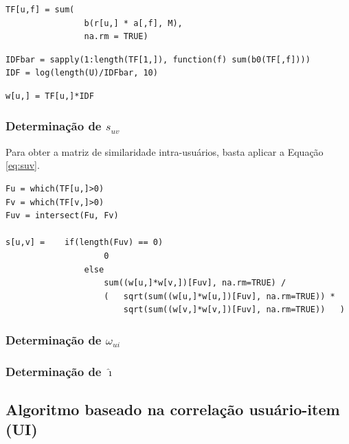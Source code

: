 \begin{lstlisting}[caption=Determinação de $\mathrm{TF}_{uf}$,label=lst:tf]
TF[u,f] = sum(
        		b(r[u,] * a[,f], M),
        		na.rm = TRUE)
\end{lstlisting}


\begin{lstlisting}[caption=Determinação de $\mathrm{IDF}_{f}$,label=lst:idf]
IDFbar = sapply(1:length(TF[1,]), function(f) sum(b0(TF[,f])))
IDF = log(length(U)/IDFbar, 10)
\end{lstlisting}

\begin{lstlisting}[caption=Determinação de $w_{uf}$,label=lst:wuf]
w[u,] = TF[u,]*IDF
\end{lstlisting}

\subsubsection{Determinação de $s_{uv}$} %
\label{ssub:determina_o_de_}

Para obter a matriz de similaridade intra-usuários, basta aplicar a Equação \ref{eq:suv}.

\begin{lstlisting}[caption=Determinação de $s_{uv}$]
Fu = which(TF[u,]>0)
Fv = which(TF[v,]>0)
Fuv = intersect(Fu, Fv)

s[u,v] = 	if(length(Fuv) == 0) 
					0 
				else 
					sum((w[u,]*w[v,])[Fuv], na.rm=TRUE) / 
					(	sqrt(sum((w[u,]*w[u,])[Fuv], na.rm=TRUE)) * 
						sqrt(sum((w[v,]*w[v,])[Fuv], na.rm=TRUE))	)

\end{lstlisting}

\subsubsection{Determinação de $\omega_{ui}$} %
\label{ssub:determina_o_de_}

\subsubsection{Determinação de $\hat{\imath}$} %
\label{ssub:determina_o_de_}

\subsection{Algoritmo baseado na correlação usuário-item (UI)} %
\label{sub:algoritmo_baseado_na_correla_o_usu_rio_item_ui_}

